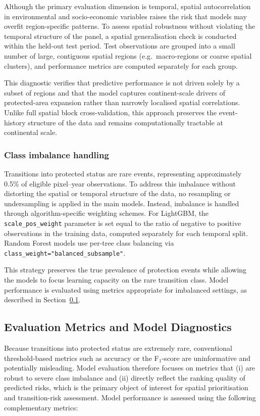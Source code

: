 \documentclass[12pt]{article}
\theoremstyle{break} %
\begin{document}
Although the primary evaluation dimension is temporal, spatial autocorrelation in environmental and socio-economic variables raises the risk that models may overfit region-specific patterns. To assess spatial robustness without violating the temporal structure of the panel, a spatial generalisation check is conducted within the held-out test period. Test observations are grouped into a small number of large, contiguous spatial regions (e.g.\ macro-regions or coarse spatial clusters), and performance metrics are computed separately for each group.

This diagnostic verifies that predictive performance is not driven solely by a subset of regions and that the model captures continent-scale drivers of protected-area expansion rather than narrowly localised spatial correlations. Unlike full spatial block cross-validation, this approach preserves the event-history structure of the data and remains computationally tractable at continental scale.

\subsubsection{Class imbalance handling}
\label{imbalance}

Transitions into protected status are rare events, representing approximately 0.5\% of eligible pixel--year observations. To address this imbalance without distorting the spatial or temporal structure of the data, no resampling or undersampling is applied in the main models. Instead, imbalance is handled through algorithm-specific weighting schemes. For LightGBM, the \texttt{scale\_pos\_weight} parameter is set equal to the ratio of negative to positive observations in the training data, computed separately for each temporal split. Random Forest models use per-tree class balancing via \texttt{class\_weight="balanced\_subsample"}.

This strategy preserves the true prevalence of protection events while allowing the models to focus learning capacity on the rare transition class. Model performance is evaluated using metrics appropriate for imbalanced settings, as described in Section~\ref{evaluation-metrics}.

\subsection{Evaluation Metrics and Model Diagnostics}
\label{evaluation-metrics}

Because transitions into protected status are extremely rare, conventional threshold-based metrics such as accuracy or the F$_1$-score are uninformative and potentially misleading. Model evaluation therefore focuses on metrics that (i) are robust to severe class imbalance and (ii) directly reflect the ranking quality of predicted risks, which is the primary object of interest for spatial prioritisation and transition-risk assessment. Model performance is assessed using the following complementary metrics:
\end{document}
